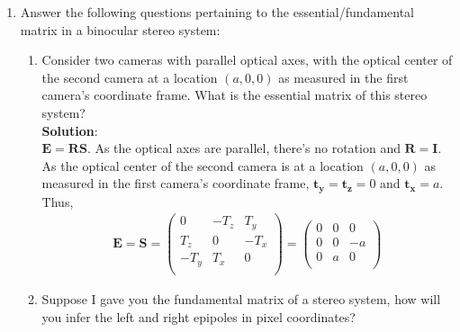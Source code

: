 \documentclass[11pt]{article}
\begin{document}
\begin{enumerate}
\item Answer the following questions pertaining to the essential/fundamental matrix in a binocular stereo system:
\begin{enumerate}
\item Consider two cameras with parallel optical axes, with the optical center of the second camera at a location $(a,0,0)$ as measured in the first camera's coordinate frame. What is the essential matrix of this stereo system? \\

\textbf{Solution}:\\
$\mathbf{E} = \mathbf{R}\mathbf{S}$. As the optical axes are parallel, there's no rotation and $\mathbf{R} = \mathbf{I}$. As the optical center of the second camera is at a location $(a,0,0)$ as measured in the first camera's coordinate frame, $\mathbf{t_y} = \mathbf{t_z} = 0$ and $\mathbf{t_x} = a$. Thus,
\begin{align*}
\mathbf{E} = \mathbf{S} = 
\begin{pmatrix}
0 & -T_z & T_y \\
T_z & 0 & -T_x \\
-T_y & T_x & 0 \\
\end{pmatrix} = 
\begin{pmatrix}
0 & 0 & 0 \\
0 & 0 & -a \\
0 & a & 0 \\
\end{pmatrix}
\end{align*}
\item Suppose I gave you the fundamental matrix of a stereo system, how will you infer the left and right epipoles in pixel coordinates? \\


\end{enumerate}
\end{enumerate}
\end{document}
